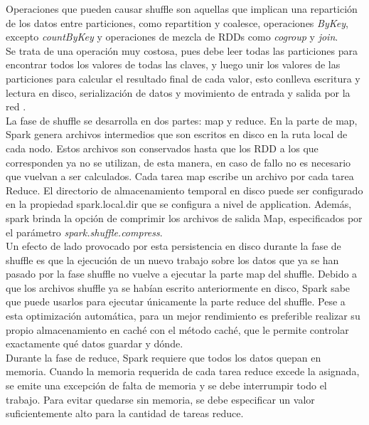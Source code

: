 Operaciones que pueden causar shuffle son aquellas que implican una repartición de los datos entre particiones, como repartition y coalesce, operaciones \textit{ByKey}, excepto  \textit{countByKey} y operaciones de mezcla de RDDs como \textit{cogroup} y \textit{join}.\\

Se trata de una operación muy costosa, pues debe leer todas las particiones para encontrar todos los valores de todas las claves, y luego unir los valores de las particiones para calcular el resultado final de cada valor, esto conlleva escritura y lectura en disco, serialización de datos y movimiento de entrada y salida por la red \cite{6RDD_Documentation}.\\

La fase de shuffle se desarrolla en dos partes: map y reduce. En la parte de map, Spark genera archivos intermedios que son escritos en disco en la ruta local de cada nodo. Estos archivos son conservados hasta que los RDD a los que corresponden ya no se utilizan, de esta manera, en caso de fallo no es necesario que vuelvan a ser calculados. Cada tarea map escribe un archivo por cada tarea Reduce. El directorio de almacenamiento temporal en disco puede ser configurado en la propiedad spark.local.dir que se configura a nivel de application. Además, spark brinda la opción de comprimir los archivos de salida Map, especificados por el parámetro \textit{spark.shuffle.compress}.\\

Un efecto de lado provocado por esta persistencia en disco durante la fase de shuffle es que la ejecución de un nuevo trabajo sobre los datos que ya se han pasado por la fase shuffle no vuelve a ejecutar la parte map del shuffle. Debido a que los archivos shuffle ya se habían escrito anteriormente en disco, Spark sabe que puede usarlos para ejecutar únicamente la parte reduce del shuffle. Pese a esta optimización automática,  para un mejor rendimiento es preferible realizar su propio almacenamiento en caché con el método caché, que le permite controlar exactamente qué datos guardar y dónde.\\

Durante la fase de reduce, Spark requiere que todos los datos quepan en memoria. Cuando la memoria requerida de cada tarea reduce excede la asignada, se emite una excepción de falta de memoria y se debe interrumpir todo el trabajo. Para evitar quedarse sin memoria, se debe especificar un valor suficientemente alto para la cantidad de tareas reduce.\\

